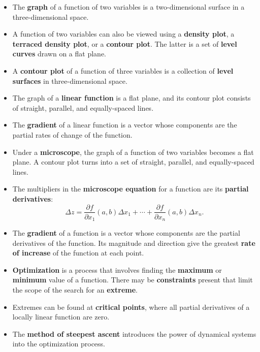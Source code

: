\begin{itemize}

\item The {\bf graph} of a function of two variables is a
  two-dimensional surface in a three-dimensional space.

\item A function of two variables can also be viewed using a {\bf
  density plot}, a {\bf terraced density plot}, or a {\bf contour
  plot}.  The latter is a set of {\bf level curves} drawn on a flat
  plane.

\item A {\bf contour plot} of a function of three variables is a
  collection of {\bf level surfaces} in three-dimensional space.

\item The graph of a {\bf linear function} is a flat plane, and its
  contour plot consists of straight, parallel, and equally-spaced
  lines.

\item The {\bf gradient} of a linear function is a vector whose
  components are the partial rates of change of the function.

\item Under a {\bf microscope}, the graph of a function of two
  variables becomes a flat plane.  A contour plot turns into a set of
  straight, parallel, and equally-spaced lines.

\item The multipliers in the {\bf microscope equation} for a function
  are its {\bf partial derivatives}:
        \[
\Delta z = \dfrac{\partial f}{\partial x_1}(a, b)\Delta x_1 + \cdots +
                \dfrac{\partial f}{\partial x_n}(a, b)\Delta x_n.
\]

\item The {\bf gradient} of a function is a vector whose components
  are the partial derivatives of the function.  Its magnitude and
  direction give the greatest {\bf rate of increase} of the function
  at each point.

\item {\bf Optimization} is a process that involves finding the {\bf
  maximum} or {\bf minimum} value of a function.  There may be {\bf
  constraints} present that limit the scope of the search for an {\bf
  extreme}.

\item Extremes can be found at {\bf critical points}, where all
  partial derivatives of a locally linear function are zero.

\item The {\bf method of steepest ascent} introduces the power of
  dynamical systems into the optimization process.

\end{itemize}

